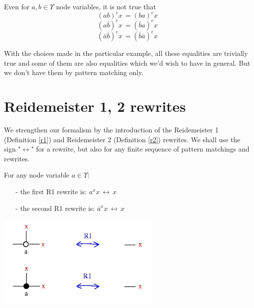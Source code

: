 \documentclass{article}
\begin{document}
Even for $a, b \in \Upsilon$ node variables, it is not true that 
\begin{equation}
(a b)^{e} x \, = (b a)^{e} x
\label{abba}
\end{equation}
\begin{equation}
(a \bar{b})^{e} x \, = (\bar{b}a)^{e} x
\label{abbara}
\end{equation}
\begin{equation}
(\bar{a} \bar{b})^{e} x \, = (\bar{b} \bar{a})^{e} x
\label{barabbara}
\end{equation}

With the choices made in the particular example, all  these equalities are trivially true and some of them are also equalities which we'd wish to have in general. But we don't have them by pattern matching only.




\section{Reidemeister 1, 2  rewrites}


We strengthen our formalism by the introduction of the Reidemeister 1 (Definition \ref{r1}) and Reidemeister 2 (Definition \ref{r2}) rewrites. We shall use the sign "$\displaystyle \longleftrightarrow$" for a rewrite, but also for any finite sequence of pattern matchings and rewrites. 

\begin{definition}
For any node variable $a \in \Upsilon$: 
\begin{enumerate}
\item[-] the first R1 rewrite is: $\displaystyle a^{x} x \, \longleftrightarrow \, x$
\item[-] the second R1 rewrite is:  $\displaystyle \bar{a}^{x} x \, \longleftrightarrow \, x$
\end{enumerate}
\centerline{\includegraphics[width=80mm]{jpg/r1.jpg}}  
\label{r1}
\end{definition}
\end{document}
